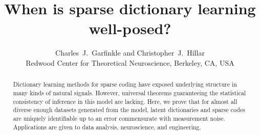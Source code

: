 \documentclass[journal, twocolumn]{IEEEtran}
\begin{document}
\title{When is sparse dictionary learning well-posed?}

\author{Charles~J.~Garfinkle and Christopher~J.~Hillar \\
Redwood Center for Theoretical Neuroscience, Berkeley, CA, USA
}
\maketitle

\begin{abstract}
Dictionary learning methods for sparse coding have exposed underlying structure in many kinds of natural signals.  
However, universal theorems guaranteeing the statistical consistency of inference in this model are lacking.  
Here, we prove that for almost all diverse enough datasets generated from the model, latent dictionaries and sparse 
codes are uniquely identifiable up to an error commensurate with measurement noise. 
Applications are given to data analysis, neuroscience, and engineering.
\end{abstract}



\end{document}
